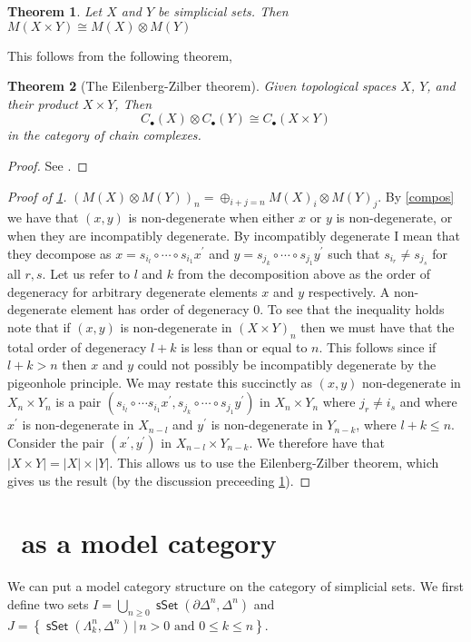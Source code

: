 \documentclass{amsart}
\newcommand{\catname}[1]{{\sffamily\upshape{{#1}}}}
\newcommand{\sset}{\catname{sSet}}
\DeclareMathOperator{\msset}{\mathsf{sSet}}
\newtheorem{theorem}{Theorem}[subsection]
\theoremstyle{definition}
\begin{document}
\begin{theorem}\label{main}
  Let $X$ and $Y$ be simplicial sets. Then
  $M(X\times Y)\cong M(X)\otimes M(Y)$
\end{theorem}
This follows from the following theorem,
\begin{theorem}[The Eilenberg-Zilber theorem]
  Given topological spaces $X$, $Y$, and their product $X\times Y$,
  Then $$C_\bullet (X)\otimes C_\bullet (Y) \cong C_\bullet(X\times Y)$$
  in the category of chain complexes.
\end{theorem}
\begin{proof}
  See \cite{EZ}.
\end{proof}
\begin{proof}[Proof of \ref{main}]
  $\left(M(X)\otimes M(Y)\right)_n = \oplus_{i+j=n} M(X)_i \otimes M(Y)_j$.
  By \ref{compos} we have that $(x,y)$ is non-degenerate when either $x$ or
  $y$ is non-degenerate, or when they are incompatibly degenerate. By incompatibly
  degenerate I mean that they decompose as
  $x=s_{i_l}\circ\cdots \circ s_{i_1} x^\prime$ and
  $y=s_{j_k}\circ \cdots \circ s_{j_1} y^\prime$ such that $s_{i_r}\neq s_{j_s}$
  for all $r,s$. Let us refer to $l$ and $k$ from the decomposition above
  as the order of degeneracy for
  arbitrary degenerate elements $x$ and $y$ respectively. A non-degenerate element
  has order of degeneracy 0. To see that the inequality
  holds note that if $(x,y)$ is non-degenerate in $(X\times Y)_n$ then we must have
  that the total order of degeneracy $l+k$ is less than or equal to $n$.
  This follows since if $l+k >n$ then $x$ and $y$ could not possibly be
  incompatibly degenerate by the pigeonhole principle. We may restate this
  succinctly as $(x,y)$ non-degenerate in $X_n\times Y_n$ is
  a pair $(s_{i_l}\circ \cdots s_{i_1} x^\prime, s_{j_k}\circ
  \cdots \circ s_{j_1}y^\prime)$ in $X_n\times Y_n$ where $j_r \neq i_s$ and
  where $x^\prime$ is
  non-degenerate in $X_{n-l}$ and $y^\prime$ is non-degenerate in $Y_{n-k}$,
  where $l+k\leq n$.
  Consider the pair $(x^\prime,y^\prime)$ in $X_{n-l}\times Y_{n-k}$.
  We therefore have that $|X\times Y| = |X| \times |Y|$. This allows us to use
  the Eilenberg-Zilber theorem, which gives us the result (by the discussion
  preceeding \ref{main}).
\end{proof}

\section{\sset  \, as a model category}
We can put a model category structure on the category of simplicial sets.
We first define two sets $I= \bigcup_{n\geq 0}\msset (\partial \Delta^n, \Delta^n)$
and $J= \left\{ \msset (\Lambda^n_k, \Delta^n)\, \big| \, n>0
  \text{ and }0\leq k\leq n \right\}$.
\end{document}

